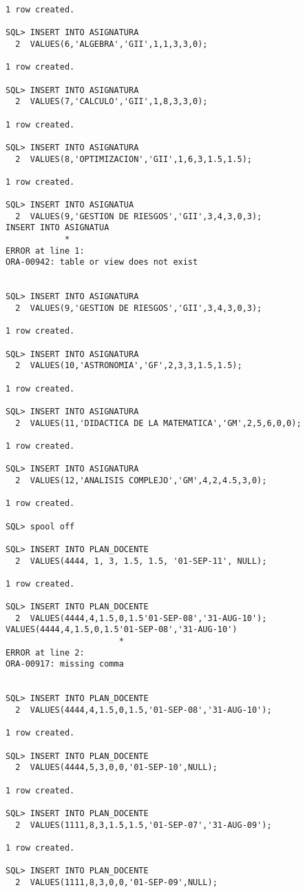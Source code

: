 \documentclass[11pt]{report}
\begin{document}
\begin{verbatim}
1 row created.

SQL> INSERT INTO ASIGNATURA
  2  VALUES(6,'ALGEBRA','GII',1,1,3,3,0);

1 row created.

SQL> INSERT INTO ASIGNATURA
  2  VALUES(7,'CALCULO','GII',1,8,3,3,0);

1 row created.

SQL> INSERT INTO ASIGNATURA
  2  VALUES(8,'OPTIMIZACION','GII',1,6,3,1.5,1.5);

1 row created.

SQL> INSERT INTO ASIGNATUA
  2  VALUES(9,'GESTION DE RIESGOS','GII',3,4,3,0,3);
INSERT INTO ASIGNATUA
            *
ERROR at line 1:
ORA-00942: table or view does not exist


SQL> INSERT INTO ASIGNATURA
  2  VALUES(9,'GESTION DE RIESGOS','GII',3,4,3,0,3);

1 row created.

SQL> INSERT INTO ASIGNATURA
  2  VALUES(10,'ASTRONOMIA','GF',2,3,3,1.5,1.5);

1 row created.

SQL> INSERT INTO ASIGNATURA
  2  VALUES(11,'DIDACTICA DE LA MATEMATICA','GM',2,5,6,0,0);

1 row created.

SQL> INSERT INTO ASIGNATURA
  2  VALUES(12,'ANALISIS COMPLEJO','GM',4,2,4.5,3,0);

1 row created.

SQL> spool off

SQL> INSERT INTO PLAN_DOCENTE
  2  VALUES(4444, 1, 3, 1.5, 1.5, '01-SEP-11', NULL);

1 row created.

SQL> INSERT INTO PLAN_DOCENTE
  2  VALUES(4444,4,1.5,0,1.5'01-SEP-08','31-AUG-10');
VALUES(4444,4,1.5,0,1.5'01-SEP-08','31-AUG-10')
                       *
ERROR at line 2:
ORA-00917: missing comma 


SQL> INSERT INTO PLAN_DOCENTE
  2  VALUES(4444,4,1.5,0,1.5,'01-SEP-08','31-AUG-10');

1 row created.

SQL> INSERT INTO PLAN_DOCENTE
  2  VALUES(4444,5,3,0,0,'01-SEP-10',NULL);

1 row created.

SQL> INSERT INTO PLAN_DOCENTE
  2  VALUES(1111,8,3,1.5,1.5,'01-SEP-07','31-AUG-09');

1 row created.

SQL> INSERT INTO PLAN_DOCENTE
  2  VALUES(1111,8,3,0,0,'01-SEP-09',NULL);


\end{verbatim}
\end{document}
